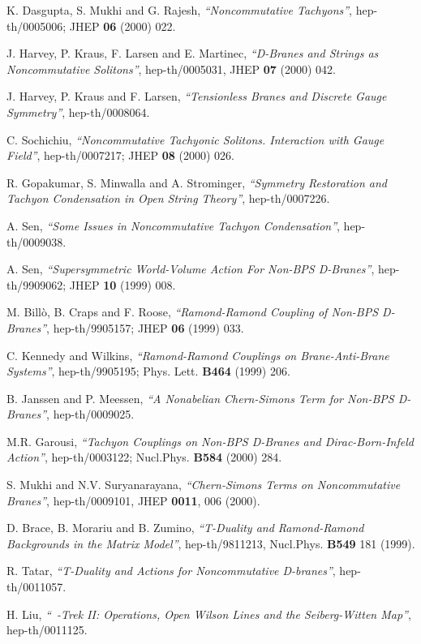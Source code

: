 \documentclass[a4paper,a4paper]{amsproc}
\theoremstyle{definition}
\theoremstyle{remark}
\numberwithin{equation}{section}
\begin{document}
\begin{thebibliography}{A}
 K. Dasgupta, S. Mukhi and G. Rajesh,
\textit{``Noncommutative Tachyons''}, hep-th/0005006; JHEP {\bf 06}
(2000) 022.

 J. Harvey, P. Kraus, F. Larsen and E. Martinec,
\textit{``D-Branes and Strings as Noncommutative Solitons''},
hep-th/0005031, JHEP {\bf 07} (2000) 042.

 J. Harvey, P. Kraus and F. Larsen, \textit{``Tensionless
Branes and Discrete Gauge Symmetry''}, hep-th/0008064.

 C. Sochichiu, \textit{``Noncommutative Tachyonic
Solitons. Interaction with Gauge Field''}, hep-th/0007217; JHEP {\bf
08} (2000) 026.

 R. Gopakumar, S. Minwalla and A. Strominger,
\textit{``Symmetry Restoration and Tachyon Condensation in Open String
Theory''}, hep-th/0007226.

 A. Sen, \textit{``Some Issues in Noncommutative
Tachyon Condensation''}, hep-th/0009038.

 A. Sen, \textit{``Supersymmetric World-Volume Action
For Non-BPS D-Branes''}, hep-th/9909062; JHEP {\bf 10} (1999) 008.

 M. Bill\`o, B. Craps and F. Roose,
\textit{``Ramond-Ramond Coupling of Non-BPS D-Branes''},
hep-th/9905157; JHEP {\bf 06} (1999) 033.

 C. Kennedy and Wilkins, \textit{``Ramond-Ramond
Couplings on Brane-Anti-Brane Systems''}, hep-th/9905195;
Phys. Lett. {\bf B464} (1999) 206.

 B. Janssen and P. Meessen, \textit{``A Nonabelian
Chern-Simons Term for Non-BPS D-Branes''}, hep-th/0009025.

 M.R. Garousi, \textit{``Tachyon Couplings on Non-BPS
D-Branes and Dirac-Born-Infeld Action''}, hep-th/0003122;
Nucl.Phys. {\bf B584} (2000) 284.

 S. Mukhi and N.V. Suryanarayana, \textit{``Chern-Simons 
Terms on Noncommutative Branes''}, hep-th/0009101, 
JHEP {\bf 0011}, 006 (2000).

 D. Brace, B. Morariu and B. Zumino,
\textit{``T-Duality and Ramond-Ramond Backgrounds in the 
Matrix Model''}, hep-th/9811213,
Nucl.Phys. {\bf B549} 181 (1999).

 R. Tatar, \textit{``T-Duality and Actions for
Noncommutative D-branes''}, hep-th/0011057.

 H. Liu, \textit{``~\myHighlight{$*$}\coordHE{}-Trek II: \coordHE{} Operations, Open
Wilson Lines and the Seiberg-Witten Map''}, hep-th/0011125.


\end{thebibliography}
\end{document}
